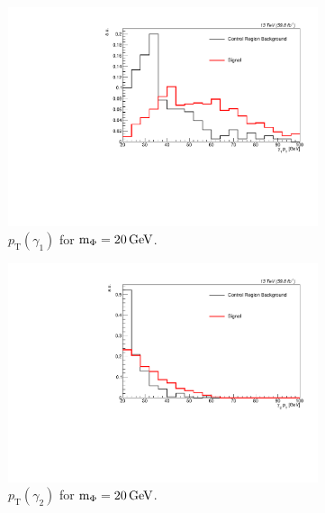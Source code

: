 \begin{figure}[htb!]
	\centering
	\captionsetup[subfigure]{justification=centering}
	\begin{subfigure}[h]{0.45\linewidth}
		\centering
		\includegraphics[width=\linewidth]{figs/05_analysis/2018_ZX_g1_pt_mx20_MU_comp.pdf}
		\caption{$p_\mathrm{T}(\gamma_1)$ for $\text{m}_\Phi=20\,\text{Ge\hspace{-.08em}V}$.}
	\end{subfigure}
	\begin{subfigure}[h]{0.45\linewidth}
		\centering
		\includegraphics[width=\linewidth]{figs/05_analysis/2018_ZX_g2_pt_mx20_MU_comp.pdf}
		\caption{$p_\mathrm{T}(\gamma_2)$ for $\text{m}_\Phi=20\,\text{Ge\hspace{-.08em}V}$.}
	\end{subfigure}
	\begin{subfigure}[h]{0.45\linewidth}
		\centering

\end{subfigure}
\end{figure}
